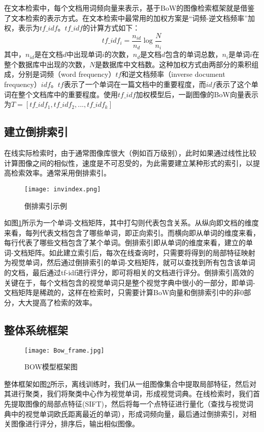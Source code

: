 在文本检索中，每个文档用词频向量来表示，基于BoW的图像检索框架就是借鉴了文本检索的表示方式。在文本检索中最常用的加权方案是“词频-逆文档频率”加权，表示为$tf\_idf$。$tf\_idf$的计算方式如下：
\begin{equation}
tf\_idf_i=\frac{n_{id}}{n_d}\log\frac{N}{n_i}
\end{equation}
其中，$n_{id}$是在文档$d$中出现单词$i$的次数，$n_d$是文档$d$包含的单词总数，$n_i$是单词$i$在整个数据库中出现的次数，$N$是数据库中文档数。这种加权方式由两部分的乘积组成，分别是词频（word frequency）$tf$和逆文档频率（inverse document frequency）$idf$。$tf$表示了一个单词在一篇文档中的重要程度，而$idf$表示了这个单词在整个文档库中的重要程度。使用$tf\_idf$加权模型后，一副图像的BoW向量表示为$T=[tf\_idf_1,tf\_idf_2,...,tf\_idf_k]$

\subsection{建立倒排索引}
在线实际检索时，由于通常图像库很大（例如百万级别），此时如果通过线性比较计算图像之间的相似性，速度是不可忍受的，为此需要建立某种形式的索引，以提高检索效率。通常采用倒排索引。
\begin{figure}[h]
	\centering
	\texttt{[image: invindex.png]}
	\caption{倒排索引示例}\label{fig:invindex}
\end{figure}
如图\ref{fig:invindex}所示为一个单词-文档矩阵，其中打勾则代表包含关系。从纵向即文档的维度来看，每列代表文档包含了哪些单词，即正向索引。而横向即从单词的维度来看，每行代表了哪些文档包含了某个单词。倒排索引即从单词的维度来看，建立的单词-文档矩阵。如此建立索引后，每次在线查询时，只需要将得到的局部特征映射为视觉单词，然后通过倒排索引的单词-文档矩阵，就可以查找到所有包含该单词的文档，最后通过tf-idf进行评分，即可将相关的文档进行评分。倒排索引高效的关键在于，每个文档包含的视觉单词只是整个视觉字典中很小的一部分，即单词-文档矩阵是稀疏的，这样在检索时，只需要计算BoW向量和倒排索引中的非0部分，大大提高了检索的效率。

\subsection{整体系统框架}
\begin{figure}[h]
	\centering
	\texttt{[image: Bow\_frame.jpg]}
	\caption{BOW模型框架图}\label{fig:bowframe}
\end{figure}
整体框架如图\ref{fig:bowframe}所示，离线训练时，我们从一组图像集合中提取局部特征，然后对其进行聚类，我们将聚类中心作为视觉单词，形成视觉词典。在线检索时，我们首先提取图像的局部点特征(SIFT)，然后将每一个点特征进行量化（查找与视觉词典中的视觉单词欧氏距离最近的单词），形成词频向量，最后通过倒排索引，对相关图像进行评分，排序后，输出相似图像。

